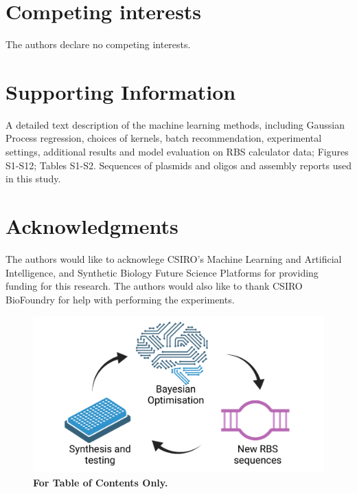 \documentclass{scrartcl}[2013/05/29]%
\begin{document}
\section*{Competing interests}
The authors declare no competing interests.

\section*{Supporting Information}

A detailed text description of the machine learning methods, including Gaussian Process regression, choices of kernels, batch recommendation, experimental settings, additional results and model evaluation on RBS calculator data; Figures S1-S12; Tables S1-S2. Sequences of plasmids and oligos and assembly reports used in this study.


\section*{Acknowledgments}
The authors would like to acknowlege CSIRO's Machine Learning and Artificial Intelligence, and Synthetic Biology Future Science Platforms for providing funding for this research. The authors would also like to thank CSIRO BioFoundry for help with performing the experiments.


\newpage

\printbibliography

\newpage

\begin{figure}[h]
    \centering
    \includegraphics[scale=0.5]{paper/plots/Supplementary/TOC.pdf}
    \caption{\textbf{For Table of Contents Only.} }
    \label{fig: TOC}
\end{figure}

\clearpage
\end{document}

